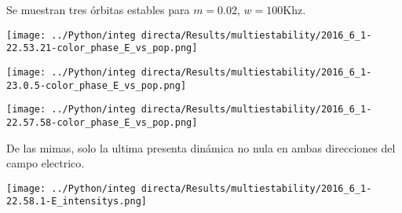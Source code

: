 		Se muestran tres órbitas estables para $m=0.02$, $w=100$Khz.
		
		\begin{minipage}{0.33\textwidth}
		\centering
		\texttt{[image: ../Python/integ directa/Results/multiestability/2016\_6\_1-22.53.21-color\_phase\_E\_vs\_pop.png]}
		
		\end{minipage}
		\begin{minipage}{0.33\textwidth}
		
		\centering
		\texttt{[image: ../Python/integ directa/Results/multiestability/2016\_6\_1-23.0.5-color\_phase\_E\_vs\_pop.png]}
		
		\end{minipage}
		\begin{minipage}{0.33\textwidth}
		
		\centering
		\texttt{[image: ../Python/integ directa/Results/multiestability/2016\_6\_1-22.57.58-color\_phase\_E\_vs\_pop.png]}
		
		\end{minipage}
		
		
		De las mimas, solo la ultima presenta dinámica no nula en ambas direcciones del campo electrico.
		
		\begin{minipage}{0.5\textwidth}
		
		\centering
		\texttt{[image: ../Python/integ directa/Results/multiestability/2016\_6\_1-22.58.1-E\_intensitys.png]}
		
		\end{minipage}